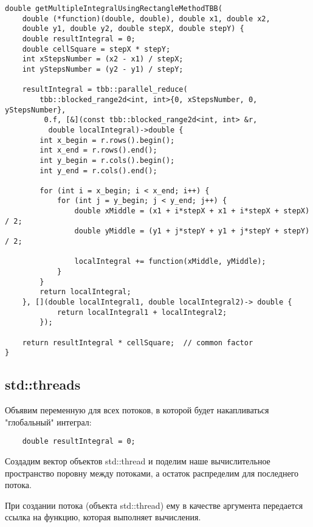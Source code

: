 \documentclass{article}
\begin{document}
\vspace{10pt}
\begin{lstlisting}
double getMultipleIntegralUsingRectangleMethodTBB(
    double (*function)(double, double), double x1, double x2,
    double y1, double y2, double stepX, double stepY) {
    double resultIntegral = 0;
    double cellSquare = stepX * stepY;
    int xStepsNumber = (x2 - x1) / stepX;
    int yStepsNumber = (y2 - y1) / stepY;

    resultIntegral = tbb::parallel_reduce(
        tbb::blocked_range2d<int, int>{0, xStepsNumber, 0, yStepsNumber},
         0.f, [&](const tbb::blocked_range2d<int, int> &r,
          double localIntegral)->double {
        int x_begin = r.rows().begin();
        int x_end = r.rows().end();
        int y_begin = r.cols().begin();
        int y_end = r.cols().end();

        for (int i = x_begin; i < x_end; i++) {
            for (int j = y_begin; j < y_end; j++) {
                double xMiddle = (x1 + i*stepX + x1 + i*stepX + stepX) / 2;
                double yMiddle = (y1 + j*stepY + y1 + j*stepY + stepY) / 2;

                localIntegral += function(xMiddle, yMiddle);
            }
        }
        return localIntegral;
    }, [](double localIntegral1, double localIntegral2)-> double {
            return localIntegral1 + localIntegral2;
        });

    return resultIntegral * cellSquare;  // common factor
}
\end{lstlisting}

\newpage

\subsection{std::threads}

\par Объявим переменную для всех потоков, в которой будет накапливаться "глобальный" интеграл:

\vspace{10pt}
\begin{lstlisting}
    double resultIntegral = 0;
\end{lstlisting}

\par Создадим вектор объектов std::thread и поделим наше вычислительное пространство поровну между потоками, а остаток распределим для последнего потока.

\par При создании потока (объекта std::thread) ему в качестве аргумента передается ссылка на функцию, которая выполняет вычисления.
\end{document}
